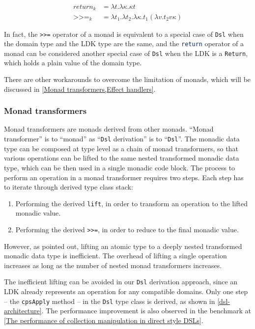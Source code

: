 \begin{align}
\label{return_k}
return_k &= \lambda t.\lambda \kappa.\kappa t\\
\label{>>=_k}
\texttt{>>=}_k &= \lambda t_1.\lambda t_2.\lambda \kappa.t_1\left(\lambda v.t_2 v\kappa\right)
\end{align}

In fact, the \lstinline{>>=} operator of a monad is equivalent to a special case of \lstinline{Dsl} when the domain type and the LDK type are the same, and the \lstinline[language=Haskell,deletekeywords={return}]{return} operator of a monad can be considered another special case of \lstinline{Dsl} when the LDK is a \lstinline{Return}, which holds a plain value of the domain type.

There are other workarounds to overcome the limitation of monads, which will be discussed in \cref{Monad transformers,Effect handlers}.

\subsubsection{Monad transformers}\label{Monad transformers}

Monad transformers \cite{liang1995monad} are monads derived from other monads. ``Monad transformer'' is to ``monad'' as ``\lstinline{Dsl} derivation'' is to ``\lstinline{Dsl}''. The monadic data type can be composed at type level as a chain of monad transformers, so that various operations can be lifted to the same nested transformed monadic data type, which can be then used in a single monadic code block. The process to perform an operation in a monad transformer requires two steps. Each step has to iterate through derived type class stack:

\begin{enumerate}
  \item Performing the derived \lstinline{lift}, in order to transform an operation to the lifted monadic value.
  \item Performing the derived \lstinline{>>=}, in order to reduce to the final monadic value.
\end{enumerate}

However, as \cite{kiselyov2013extensible} pointed out, lifting an atomic type to a deeply nested transformed monadic data type is inefficient. The overhead of lifting a single operation increases as long as the number of nested monad transformers increases.

The inefficient lifting can be avoided in our \lstinline{Dsl} derivation approach, since an LDK already represents an operation for any compatible domains. Only one step -- the \lstinline{cpsApply} method -- in the \lstinline{Dsl} type class is derived, as shown in \cref{dsl-architecture}. The performance improvement is also observed in the benchmark at \cref{The performance of collection manipulation in direct style DSLs}.

